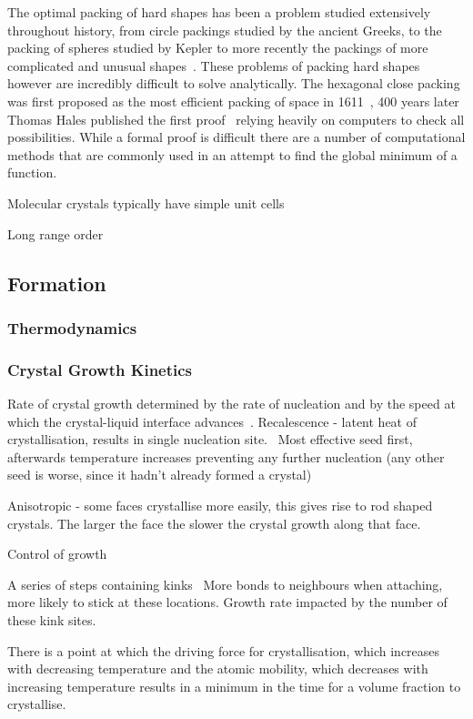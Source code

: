 The optimal packing of hard shapes has been a problem studied extensively throughout history, from circle packings studied by the ancient Greeks, to the packing of spheres studied by Kepler to more recently the packings of more complicated and unusual shapes~\cite{atkinson:12,torquato:12}. These problems of packing hard shapes however are incredibly difficult to solve analytically. The hexagonal close packing was first proposed as the most efficient packing of space in 1611~\cite{kepler:1611}, 400 years later Thomas Hales published the first proof~\cite{hales:05,hales:14} relying heavily on computers to check all possibilities. While a formal proof is difficult there are a number of computational methods that are commonly used in an attempt to find the global minimum of a function.

Molecular crystals typically have simple unit cells~\cite{brock:94}

Long range order
\subsection{Formation}
\subsubsection{Thermodynamics}

\subsubsection{Crystal Growth Kinetics}
Rate of crystal growth determined by the rate of nucleation and by the speed at which the crystal-liquid interface advances~\cite{turnbull:69}.
Recalescence - latent heat of crystallisation, results in single nucleation site.~\cite{turnbull:69} Most effective seed first, afterwards temperature increases preventing any further nucleation (any other seed is worse, since it hadn't already formed a crystal)

Anisotropic - some faces crystallise more easily, this gives rise to rod shaped crystals.
The larger the face the slower the crystal growth along that face.

Control of growth~\cite{de-yoreo:03}

A series of steps containing kinks~\cite{chernov:61} More bonds to neighbours when attaching, more likely to stick at these locations. Growth rate impacted by the number of these kink sites.

There is a point at which the driving force for crystallisation, which increases with decreasing temperature and the atomic mobility, which decreases with increasing temperature results in a minimum in the time for a volume fraction to crystallise.~\cite{uhlmann:71}
\begin{figure}
\end{figure}


